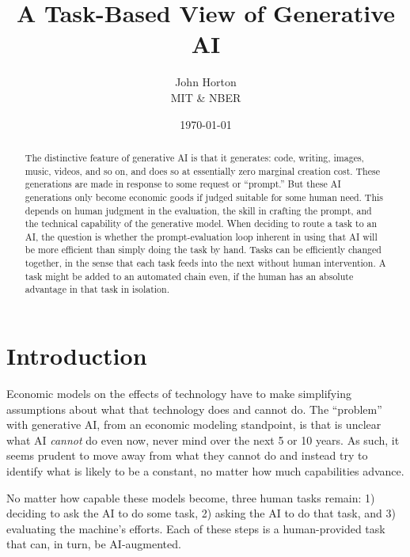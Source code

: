 \documentclass{article}
\begin{document}
\title{A Task-Based View of Generative AI}
\author{John Horton\\MIT \& NBER}
\date{\today{}}

\newcommand{\machine}[1]{\langle #1 \rangle}
\newcommand{\human}[1]{( #1 )}
\newcommand{\cost}[1]{C\{ #1 \}}

\maketitle

\begin{abstract}
\noindent The distinctive feature of generative AI is that it generates: code, writing, images, music, videos, and so on, and does so at essentially zero marginal creation cost.
These generations are made in response to some request or ``prompt.''
But these AI generations only become economic goods if judged suitable for some human need.
This depends on human judgment in the evaluation, the skill in crafting the prompt, and the technical capability of the generative model. 
When deciding to route a task to an  AI, the question is whether the prompt-evaluation loop inherent in using that AI will be more efficient than simply doing the task by hand. 
Tasks can be efficiently changed together, in the sense that each task feeds into the next without human intervention.
A task might be added to an automated chain even, if the human has an absolute advantage in that task in isolation.
\end{abstract}

\onehalfspacing

\section{Introduction}
Economic models on the effects of technology have to make simplifying assumptions about what that technology does and cannot do.
The ``problem'' with generative AI, from an economic modeling standpoint, is that is unclear what AI \emph{cannot} do even now, never mind over the next 5 or 10 years. 
As such, it seems prudent to move away from what they cannot do and instead try to identify what is likely to be a constant, no matter how much capabilities advance.

No matter how capable these models become, three human tasks remain:
1) deciding to ask the AI to do some task, 
2) asking the AI to do that task, and 
3) evaluating the machine's efforts. 
Each of these steps is a human-provided task that can, in turn, be AI-augmented. 
\end{document}
